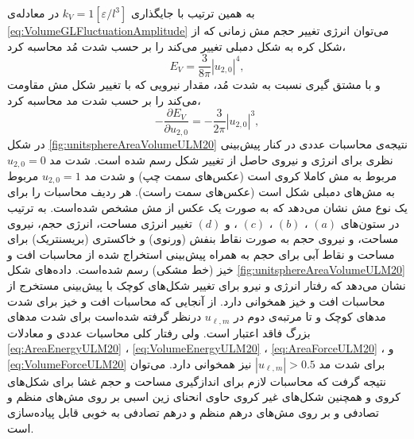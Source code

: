 به همین ترتیب با جایگذاری 
$k_V=1[\varepsilon/l^3]$
در معادله‌ی
\ref{eq:VolumeGLFluctuationAmplitude}
می‌توان انرژی تغییر حجم مش زمانی که از  شکل کره به شکل دمبلی تغییر می‌کند را بر حسب شدت مُد محاسبه کرد،
\begin{equation}
E_V= \frac{3}{8\pi}|u_{2,0}|^4,
\label{eq:VolumeEnergyULM20}
\end{equation}
و با مشتق ‌گیری نسبت به شدت مُد، مقدار نیرویی که با تغییر شکل مش مقاومت می‌کند را بر حسب شدت مد محاسبه کرد،
\begin{equation}
-\frac{\partial E_V}{\partial u_{2,0}}= -\frac{3}{2\pi}|u_{2,0}|^3,
\label{eq:VolumeForceULM20}
\end{equation}
در شکل
\ref{fig:unitsphereAreaVolumeULM20}
نتیجه‌ی محاسبات عددی در کنار پیش‌بینی نظری برای انرژی و نیروی حاصل از تغییر شکل رسم شده است. شدت مد
$u_{2,0}=0$
مربوط به مش کاملا کروی است (عکس‌های سمت چپ) و شدت مد 
$u_{2,0}=1$
مربوط به مش‌های دمبلی شکل است (عکس‌های سمت راست). هر ردیف محاسبات را برای یک نوع مش نشان می‌دهد که به صورت یک عکس از مش مشخص شده‌است. به ترتیب در ستون‌های 
$(a)$
،
$(b)$
،
$(c)$
، و
$(d)$
تغییر انرژی مساحت، انرژی حجم، نیروی مساحت، و نیروی حجم به صورت نقاط بنفش (ورنوی) و خاکستری (بریسنتریک) برای مساحت و نقاط آبی برای حجم به همراه پیش‌بینی استخراج شده از محاسبات افت و خیز (خط مشکی) رسم شده‌است. داده‌های شکل 
\ref{fig:unitsphereAreaVolumeULM20}
نشان می‌دهد که رفتار انرژی و نیرو برای تغییر شکل‌های کوچک با پیش‌بینی مستخرج از محاسبات افت و خیز همخوانی دارد. از آنجایی که محاسبات افت و خیز برای شدت مد‌های کوچک و تا مرتبه‌ی دوم در 
$u_{\ell,m}$
درنظر گرفته شده‌است برای شدت‌ مد‌های بزرگ فاقد اعتبار است. ولی رفتار کلی محاسبات عددی و معادلات
\ref{eq:AreaEnergyULM20}
،
\ref{eq:VolumeEnergyULM20}
،
\ref{eq:AreaForceULM20}
، و
\ref{eq:VolumeForceULM20}
برای شد‌ت مد 
$|u_{\ell,m}|>0.5$
نیز همخوانی دارد. می‌توان نتیجه گرفت که محاسبات لازم برای اندازگیری مساحت و حجم غشا برای شکل‌های کروی و همچنین شکل‌های غیر کروی حاوی انحنای زین اسبی بر روی مش‌های منظم و تصادفی و بر روی مش‌های درهم منظم و درهم تصادفی به خوبی قابل پیاده‌سازی است.










